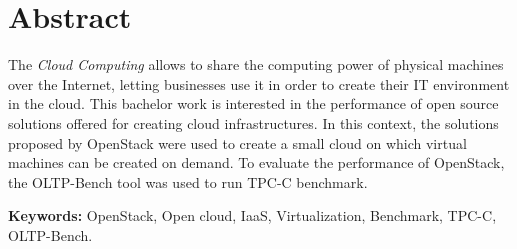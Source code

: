 \documentclass[a4paper, 12pt, oneside, titlepage]{scrbook}
\begin{document}

\tableofcontents
\listoffigures
\listoftables
\doublespacing



\chapter*{Abstract}
\thispagestyle{empty}
The \textit{Cloud Computing} allows to share the computing power of physical machines over the Internet, letting businesses use it in order to create their IT environment in the cloud.
This bachelor work is interested in the performance of open source solutions offered for creating cloud infrastructures.
In this context, the solutions proposed by OpenStack were used to create a small cloud on which virtual machines can be created on demand.
To evaluate the performance of OpenStack, the OLTP-Bench tool was used to run TPC-C benchmark.

{\bf Keywords:} OpenStack, Open cloud, IaaS, Virtualization, Benchmark, TPC-C, OLTP-Bench.






























% 
% 

















\end{document}
